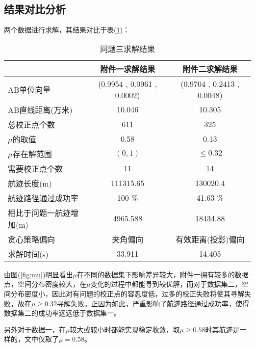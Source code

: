 \newpage
\subsection{结果对比分析}

两个数据进行求解，其结果对比于表(\ref{tab:qu3-res-all})：
\begin{table}[!htbp]
	\caption{问题三求解结果} 
	\label{tab:qu3-res-all}
	\centering
	\begin{tabular}{lcc} 
		\toprule[1.5pt] 
        & 附件一求解结果       & 附件二求解结果       \\
        \midrule[1pt] 
        AB单位向量        & (0.9954 , 0.0961 , 0.0002) & (0.9704 , 0.2413 , 0.0048) \\
        AB直线距离(万米)    & 10.046                     & 10.305                     \\
        总校正点个数        & 611                        & 325                        \\
        $\mu$的取值         & 0.58                       & 0.13                       \\
        $\mu$存在解范围    & $(0,1)$                    & $\leq 0.32 $               \\
        需要校正点个数       & 11                         & 14                         \\
        航迹长度(m)       & 111315.65                  & 130020.4                   \\
        航迹路径通过成功率     & 100 \%                   & 41.63 \%                     \\
        相比于问题一航迹增加(m) & 4965.588                   & 18434.88                \\
        贪心策略偏向        & 夹角偏向                       & 有效距离(投影)偏向                 \\
        求解时间(s)       & 33.911                     & 14.405 \\
		\bottomrule[1.5pt] 
\end{tabular}\end{table}

由图(\ref{fig:mu})明显看出$\mu$在不同的数据集下影响差异较大，附件一拥有较多的数据点，空间分布密度较大，在$\mu$变化的过程中都能寻到较优解，而对于数据集二，空间分布密度小，因此对有问题的校正点的容忍度低，过多的校正失败将使其寻解失败，故在$\mu \geq 0.32 $寻解失败。正因为如此，严重影响了航迹路径通过成功率，使得数据集二的成功率远远低于数据集一。

另外对于数据一，在$\mu$较大或较小时都能实现稳定收敛，取$\mu \geq 0.58 $时其航迹是一样的，文中仅取了$\mu = 0.58 $。


